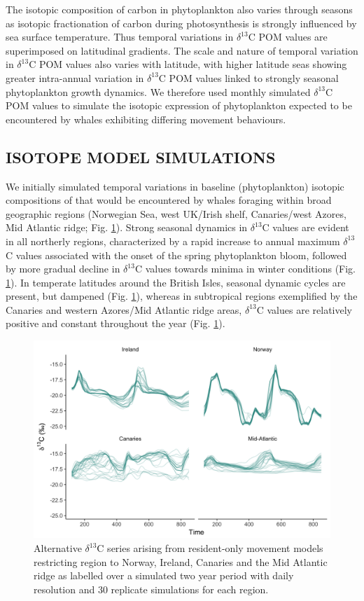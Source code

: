 \documentclass[a4paper,12pt]{article}
\begin{document}
The isotopic composition of carbon in phytoplankton also varies through seasons as isotopic fractionation of carbon during photosynthesis is strongly influenced by sea surface temperature\cite{laws1995dependence}. 
Thus temporal variations in $\delta^{13}$C POM values are superimposed on latitudinal gradients. 
The scale and nature of temporal variation in $\delta^{13}$C POM values also varies with latitude, with higher latitude seas showing greater intra-annual variation in $\delta^{13}$C POM values linked to strongly seasonal phytoplankton growth dynamics. 
We therefore used monthly simulated $\delta^{13}$C POM values to simulate the isotopic expression of phytoplankton expected to be encountered by whales exhibiting differing movement behaviours.
 
\subsection*{ISOTOPE MODEL SIMULATIONS}
We initially simulated temporal variations in baseline (phytoplankton) isotopic compositions of that would be encountered by whales foraging within broad geographic regions (Norwegian Sea, west UK/Irish shelf, Canaries/west Azores, Mid Atlantic ridge; Fig. \ref{figs4}). 
Strong seasonal dynamics in $\delta^{13}$C values are evident in all northerly regions, characterized by a rapid increase to annual maximum $\delta^{13}$C values associated with the onset of the spring phytoplankton bloom, followed by more gradual decline in $\delta^{13}$C values towards minima in winter conditions (Fig. \ref{figs4}). 
In temperate latitudes around the British Isles, seasonal dynamic cycles are present, but dampened (Fig. \ref{figs4}), whereas in subtropical regions exemplified by the Canaries and western Azores/Mid Atlantic ridge areas, $\delta^{13}$C values are relatively positive and constant throughout the year (Fig. \ref{figs4}).
 
  \begin{figure}[!htbp]
    \centering
      \includegraphics[width=\linewidth]{figures/Figure-S4-facet-wrap-d13C.png}
      \caption{Alternative $\delta^{13}$C series arising from resident-only movement models restricting region to Norway, Ireland, Canaries and the Mid Atlantic ridge as labelled over a simulated two year period with daily resolution and 30 replicate simulations for each region.} %
      \label{figs4}
  \end{figure}
 
\end{document}
